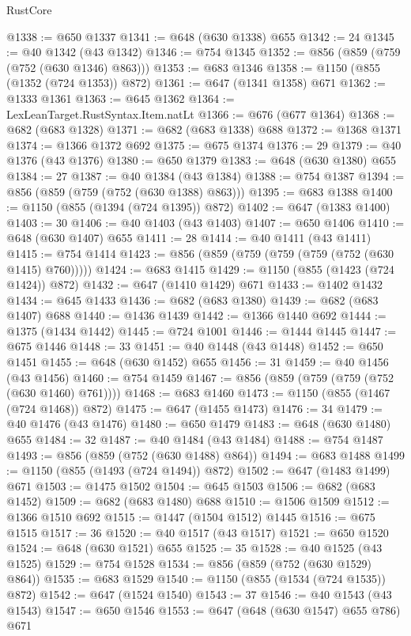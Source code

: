 \begin{lexlean}{RustCore}
\begin{coremodule}
@1338 := @650 @1337
@1341 := @648 (@630 @1338) @655
@1342 := 24
@1345 := @40 @1342 (@43 @1342)
@1346 := @754 @1345
@1352 := @856 (@859 (@759 (@752 (@630 @1346) @863)))
@1353 := @683 @1346
@1358 := @1150 (@855 (@1352 (@724 @1353)) @872)
@1361 := @647 (@1341 @1358) @671
@1362 := @1333 @1361
@1363 := @645 @1362
@1364 := LexLeanTarget.RustSyntax.Item.natLt
@1366 := @676 (@677 @1364)
@1368 := @682 (@683 @1328)
@1371 := @682 (@683 @1338) @688
@1372 := @1368 @1371
@1374 := @1366 @1372 @692
@1375 := @675 @1374
@1376 := 29
@1379 := @40 @1376 (@43 @1376)
@1380 := @650 @1379
@1383 := @648 (@630 @1380) @655
@1384 := 27
@1387 := @40 @1384 (@43 @1384)
@1388 := @754 @1387
@1394 := @856 (@859 (@759 (@752 (@630 @1388) @863)))
@1395 := @683 @1388
@1400 := @1150 (@855 (@1394 (@724 @1395)) @872)
@1402 := @647 (@1383 @1400)
@1403 := 30
@1406 := @40 @1403 (@43 @1403)
@1407 := @650 @1406
@1410 := @648 (@630 @1407) @655
@1411 := 28
@1414 := @40 @1411 (@43 @1411)
@1415 := @754 @1414
@1423 := @856 (@859 (@759 (@759 (@759 (@752 (@630 @1415) @760)))))
@1424 := @683 @1415
@1429 := @1150 (@855 (@1423 (@724 @1424)) @872)
@1432 := @647 (@1410 @1429) @671
@1433 := @1402 @1432
@1434 := @645 @1433
@1436 := @682 (@683 @1380)
@1439 := @682 (@683 @1407) @688
@1440 := @1436 @1439
@1442 := @1366 @1440 @692
@1444 := @1375 (@1434 @1442)
@1445 := @724 @1001
@1446 := @1444 @1445
@1447 := @675 @1446
@1448 := 33
@1451 := @40 @1448 (@43 @1448)
@1452 := @650 @1451
@1455 := @648 (@630 @1452) @655
@1456 := 31
@1459 := @40 @1456 (@43 @1456)
@1460 := @754 @1459
@1467 := @856 (@859 (@759 (@759 (@752 (@630 @1460) @761))))
@1468 := @683 @1460
@1473 := @1150 (@855 (@1467 (@724 @1468)) @872)
@1475 := @647 (@1455 @1473)
@1476 := 34
@1479 := @40 @1476 (@43 @1476)
@1480 := @650 @1479
@1483 := @648 (@630 @1480) @655
@1484 := 32
@1487 := @40 @1484 (@43 @1484)
@1488 := @754 @1487
@1493 := @856 (@859 (@752 (@630 @1488) @864))
@1494 := @683 @1488
@1499 := @1150 (@855 (@1493 (@724 @1494)) @872)
@1502 := @647 (@1483 @1499) @671
@1503 := @1475 @1502
@1504 := @645 @1503
@1506 := @682 (@683 @1452)
@1509 := @682 (@683 @1480) @688
@1510 := @1506 @1509
@1512 := @1366 @1510 @692
@1515 := @1447 (@1504 @1512) @1445
@1516 := @675 @1515
@1517 := 36
@1520 := @40 @1517 (@43 @1517)
@1521 := @650 @1520
@1524 := @648 (@630 @1521) @655
@1525 := 35
@1528 := @40 @1525 (@43 @1525)
@1529 := @754 @1528
@1534 := @856 (@859 (@752 (@630 @1529) @864))
@1535 := @683 @1529
@1540 := @1150 (@855 (@1534 (@724 @1535)) @872)
@1542 := @647 (@1524 @1540)
@1543 := 37
@1546 := @40 @1543 (@43 @1543)
@1547 := @650 @1546
@1553 := @647 (@648 (@630 @1547) @655 @786) @671

\end{coremodule}
\end{lexlean}
